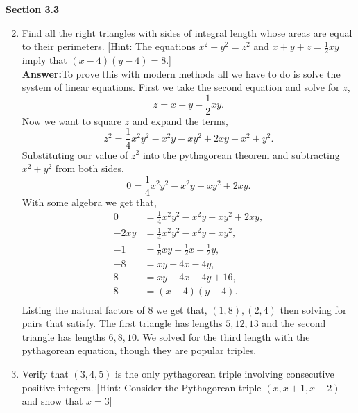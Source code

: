 \documentclass[12pt]{article}
\theoremstyle{homework}
\begin{document}
\textbf{Section 3.3}
\begin{enumerate}
\setcounter{enumi}{1}
\item Find all the right triangles with sides of integral length whose areas are equal to their perimeters. [Hint: The equations $x^2 + y^2 = z^2$
and $x + y + z = \frac{1}{2}xy$ imply that $(x-4)(y - 4) = 8$.]\\

\textbf{Answer:}To prove this with modern methods all we have to do is solve the system of linear equations. First we take the second equation and solve for $z$,
\begin{equation*}
  z = x + y - \frac{1}{2}xy.
\end{equation*} 
Now we want to square $z$ and expand the terms,
\begin{equation*}
  z^2 = \frac{1}{4}x^2y^2 -x^2y - xy^2 + 2xy + x^2 + y^2.
\end{equation*}
Substituting our value of $z^2$ into the pythagorean theorem and subtracting $x^2 + y^2$ from both sides,
\begin{equation*}
  0 = \frac{1}{4}x^2y^2 -x^2y - xy^2 + 2xy.
\end{equation*}
With some algebra we get that, 
\begin{align*}
  0 &= \frac{1}{4}x^2y^2 -x^2y - xy^2 + 2xy,\\
  -2xy &= \frac{1}{4}x^2y^2 -x^2y - xy^2,\\
  -1 &= \frac{1}{8}xy - \frac{1}{2}x - \frac{1}{2}y,\\
  -8 &= xy - 4x - 4y,\\
  8 &= xy - 4x - 4y + 16,\\
  8 &= (x-4)(y - 4).\\
\end{align*}
Listing the natural factors of 8 we get that, ${(1,8),(2,4)}$ then solving for pairs that satisfy. The first triangle has lengths $5, 12,13 $ and the second triangle has lengths $6, 8, 10$. We solved
for the third length with the pythagorean equation, though they are popular triples.  


\vspace{.5in}





\setcounter{enumi}{3}
\item Verify that $(3,4,5)$ is the only pythagorean triple involving consecutive positive integers. [Hint: Consider the Pythagorean triple $(x, x+1, x+2)$ and show that $x = 3$] \\


\end{enumerate}
\end{document}
